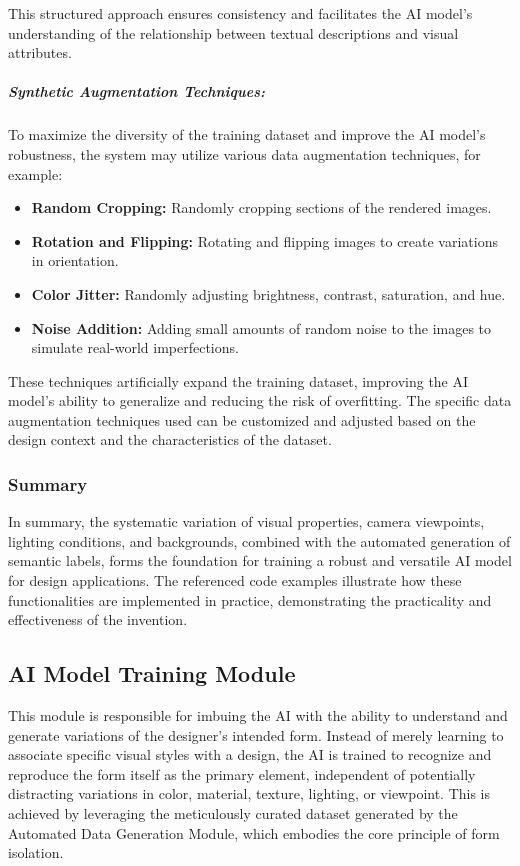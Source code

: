 \documentclass{article}
\begin{document}
This structured approach ensures consistency and facilitates the AI model's understanding of the relationship between textual descriptions and visual attributes.

\subparagraph{Synthetic Augmentation Techniques:} To maximize the diversity of the training dataset and improve the AI model's robustness, the system may utilize various data augmentation techniques, for example:

\begin{itemize}
    \item \textbf{Random Cropping:} Randomly cropping sections of the rendered images.
    \item \textbf{Rotation and Flipping:} Rotating and flipping images to create variations in orientation.
    \item \textbf{Color Jitter:} Randomly adjusting brightness, contrast, saturation, and hue.
    \item \textbf{Noise Addition:} Adding small amounts of random noise to the images to simulate real-world imperfections.
\end{itemize}

These techniques artificially expand the training dataset, improving the AI model's ability to generalize and reducing the risk of overfitting. The specific data augmentation techniques used can be customized and adjusted based on the design context and the characteristics of the dataset.

\subsubsection{Summary}

In summary, the systematic variation of visual properties, camera viewpoints, lighting conditions, and backgrounds, combined with the automated generation of semantic labels, forms the foundation for training a robust and versatile AI model for design applications. The referenced code examples illustrate how these functionalities are implemented in practice, demonstrating the practicality and effectiveness of the invention.

\subsection{AI Model Training Module}

This module is responsible for imbuing the AI with the ability to understand and generate variations of the designer's intended form. Instead of merely learning to associate specific visual styles with a design, the AI is trained to recognize and reproduce the form itself as the primary element, independent of potentially distracting variations in color, material, texture, lighting, or viewpoint. This is achieved by leveraging the meticulously curated dataset generated by the Automated Data Generation Module, which embodies the core principle of form isolation.
\end{document}
